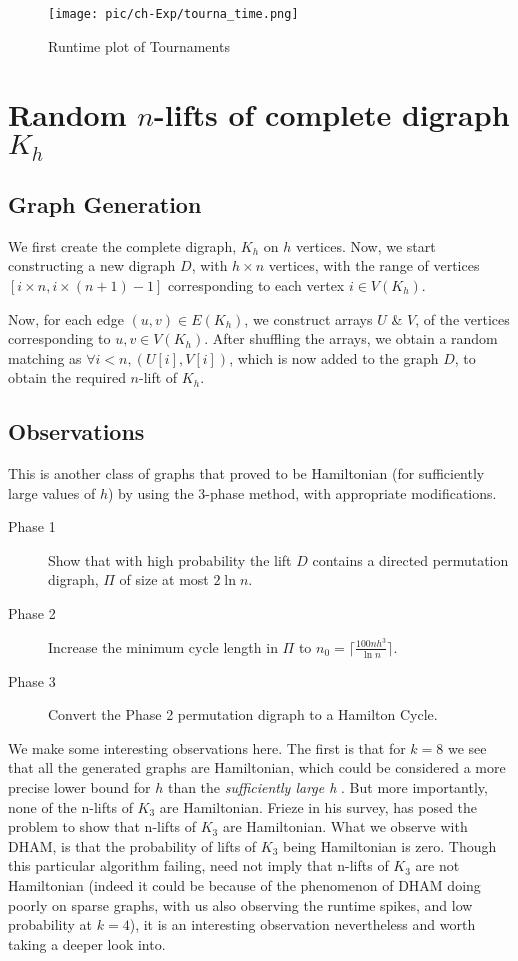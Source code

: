 \begin{figure}[ht]

\centering
\texttt{[image: pic/ch-Exp/tourna\_time.png]}
\caption{Runtime plot of Tournaments}
\label{fig:tourna:time}

\end{figure}

\section{Random $n$-lifts of complete digraph $K_h$}
\subsection{Graph Generation}
We first create the complete digraph, $K_h$ on $h$ vertices. Now, we start constructing a new digraph $D$, with $h \times n$ vertices, with the range of vertices $[i \times n, i \times (n+1) - 1]$ corresponding to each vertex $i\in V(K_h)$. 

Now, for each edge $(u, v) \in E(K_h)$, we construct arrays $U$ \& $V$, of the vertices corresponding to $u, v \in V(K_h)$. After shuffling the arrays, we obtain a random matching as $\forall i<n, (U[i], V[i])$, which is now added to the graph $D$, to obtain the required $n$-lift of $K_h$.
\subsection{Observations}
This is another class of graphs that proved to be Hamiltonian \cite{frieze:lift} (for sufficiently large values of $h$) by using the 3-phase method, with appropriate modifications.
\begin{description}
\item[Phase 1] Show that with high probability the lift $D$ contains a directed permutation digraph, $\Pi$ of size at most $2\ln n$.
\item[Phase 2] Increase the minimum cycle length in $\Pi$ to $n_0 = \Big\lceil \frac{100nh^3}{\ln n} \Big\rceil$.
\item[Phase 3] Convert the Phase 2 permutation digraph to a Hamilton Cycle.
\end{description}

We make some interesting observations here. 
The first is that for $k=8$ we see that all the generated graphs are Hamiltonian, which could be considered a more precise lower bound for $h$ than the \textit{sufficiently large h} . But more importantly, none of the n-lifts of $K_3$ are Hamiltonian. Frieze in his survey\cite{frieze:2019survey}, has posed the problem to show that n-lifts of $K_3$ are Hamiltonian. What we observe with DHAM, is that the probability of lifts of $K_3$ being Hamiltonian is zero. Though this particular algorithm failing, need not imply that n-lifts of $K_3$ are not Hamiltonian (indeed it could be because of the phenomenon of DHAM doing poorly on sparse graphs, with us also observing the runtime spikes, and low probability at $k=4$), it is an interesting observation nevertheless and worth taking a deeper look into.

